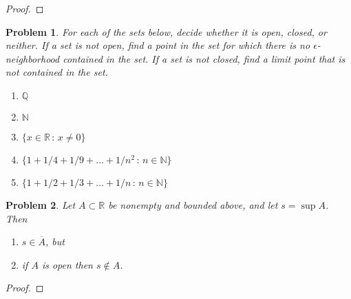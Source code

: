 \documentclass[12pt]{article}
\newtheorem{problem}{Problem}
\newcommand{\NN}{\ensuremath{\mathbb N}}
\newcommand{\QQ}{\ensuremath{\mathbb Q}}
\newcommand{\RR}{\ensuremath{\mathbb R}}
\newcommand{\eps}{\ensuremath{\epsilon}}
\begin{document}
\begin{proof}
\end{proof}


\begin{problem} %
For each of the sets below, decide whether it is open, closed, or neither.  If a set is not open, find a point in the set for which there is no $\eps$-neighborhood contained in the set.  If a set is not closed, find a limit point that is not contained in the set.

\renewcommand{\labelenumi}{\emph{(\alph{enumi})}}
\begin{enumerate}
\item $\QQ$


\item $\NN$


\item $\{x\in\RR\,:\,x \ne 0\}$


\item $\{1 + 1/4 + 1/9 + \dots + 1/n^2\,:\,n\in \NN\}$


\item $\{1 + 1/2 + 1/3 + \dots + 1/n \,:\,n \in \NN\}$

\end{enumerate}
\end{problem}


\begin{problem} %
Let $A\subset \RR$ be nonempty and bounded above, and let $s=\sup A$.  Then
\renewcommand{\labelenumi}{\emph{(\roman{enumi})}}
\begin{enumerate}
\item $s \in \overline{A}$, but
\item if $A$ is open then $s \notin A$.
\end{enumerate}
\end{problem}


\begin{proof}
\end{proof}
\end{document}
